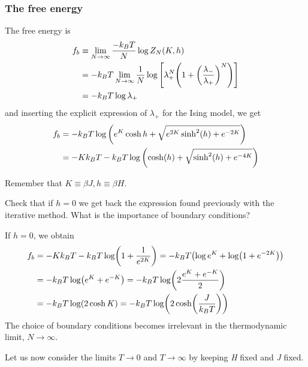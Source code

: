 \documentclass[../../Main/Main.tex]{subfiles}
\begin{document}
\subsubsection{The free energy}
The free energy is
\begin{equation*}
\begin{split}
    f_b & \equiv \lim_{N \rightarrow \infty } \frac{-k_B T}{N} \log{Z_N (K,h)}   \\
    & = -k_B T \lim_{N \rightarrow \infty } \frac{1}{N}  \log{\qty[\lambda _+^N \qty(1+\qty(\frac{\lambda _-}{\lambda _+})^N ) ] } \\
    & = -k_B T \log{\lambda _+}
\end{split}
\end{equation*}
and inserting the explicit expression of \( \lambda _+ \) for the Ising model, we get
\begin{equation}
\begin{split}
f_b  &=  -k_B T \log{ \qty( e^{K} \cosh h + \sqrt{e^{2K} \sinh^2 (h) + e^{-2K}  } ) } \\
& = -K k_B T - k_B T \log{\qty( \cosh(h)+\sqrt{\sinh^2(h)+e^{-4K}  } )}
\end{split}
\end{equation}
\begin{remark}
Remember that \( K \equiv \beta J, h \equiv \beta H\).
\end{remark}
\begin{exercise}{}{}
Check that if \( h=0 \) we get back the expression found previously with the iterative method. What is the importance of boundary conditions?
\begin{solution}
If \(h=0\), we obtain 
\begin{equation*}
\begin{split}
   f_b &= - K k_B T - k_B T \log ( 1 + \frac{1}{e^{2K}})
   = -k_B T \qty( \log e^K  +  \log ( 1 +  e^{-2K}) ) \\ 
   & = -k_B T  \log ( e^K  +  e^{-K} ) =   -k_B T  \log (2 \frac{ e^K  +  e^{-K} }{2} ) \\
   & =  -k_B T  \log (2 \cosh K ) = -k_B T  \log ( 2 \cosh (\frac{J}{k_B T }) )
\end{split}   
\end{equation*}
The choice of boundary conditions becomes irrelevant in the thermodynamic limit, \(N \rightarrow \infty\).
\end{solution}
\end{exercise}
Let us now consider the limits \( T \rightarrow 0 \) and \( T \rightarrow \infty  \) by keeping \emph{H} fixed and \emph{J} fixed.
\end{document}
